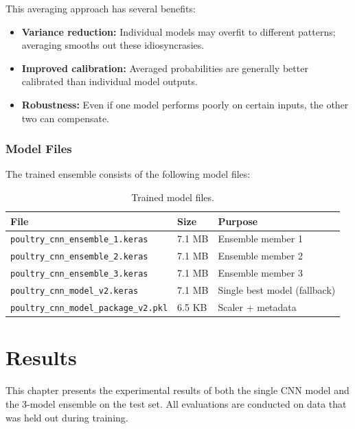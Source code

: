 \documentclass[12pt,a4paper]{report}
\begin{document}
This averaging approach has several benefits:
\begin{itemize}
    \item \textbf{Variance reduction:} Individual models may overfit to different patterns; averaging smooths out these idiosyncrasies.
    \item \textbf{Improved calibration:} Averaged probabilities are generally better calibrated than individual model outputs.
    \item \textbf{Robustness:} Even if one model performs poorly on certain inputs, the other two can compensate.
\end{itemize}

\subsection{Model Files}

The trained ensemble consists of the following model files:

\begin{table}[H]
\centering
\caption{Trained model files.}
\label{tab:model_files}
\begin{tabular}{lll}
\toprule
\textbf{File} & \textbf{Size} & \textbf{Purpose} \\
\midrule
\texttt{poultry\_cnn\_ensemble\_1.keras} & 7.1 MB & Ensemble member 1 \\
\texttt{poultry\_cnn\_ensemble\_2.keras} & 7.1 MB & Ensemble member 2 \\
\texttt{poultry\_cnn\_ensemble\_3.keras} & 7.1 MB & Ensemble member 3 \\
\texttt{poultry\_cnn\_model\_v2.keras}  & 7.1 MB & Single best model (fallback) \\
\texttt{poultry\_cnn\_model\_package\_v2.pkl} & 6.5 KB & Scaler + metadata \\
\bottomrule
\end{tabular}
\end{table}


\chapter{Results}
\label{ch:results}

This chapter presents the experimental results of both the single CNN model and the 3-model ensemble on the test set. All evaluations are conducted on data that was held out during training.
\end{document}
